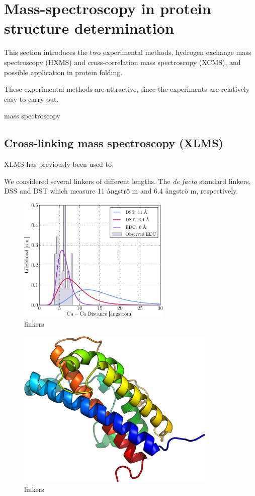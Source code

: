 \chapter{Mass-spectroscopy in protein structure determination}

This section introduces the two experimental methods, hydrogen exchange mass spectroscopy (HXMS) and cross-correlation mass spectroscopy (XCMS), and possible application in protein folding.

These experimental methods are attractive, since the experiments are relatively easy to carry out.

mass spectroscopy 

\section{Cross-linking mass spectroscopy (XLMS)}


XLMS has previously been used to 

We considered several linkers of different lengths. The \textit{de facto} standard linkers, DSS and DST which measure 11 \aa ngstr\"o m and 6.4 \aa ngstr\"o m, respectively.

\begin{figure}
    \centering
    \includegraphics[width=0.65\textwidth]{figures/xcms/lognormal.pdf}
    \caption{linkers}
    \label{fig:linkers}
\end{figure}


\begin{figure}
    \centering
    \includegraphics[width=0.85\textwidth]{figures/hGH_rainbow.pdf}
    \caption{linkers}
    \label{fig:hGH_homology}
\end{figure}


